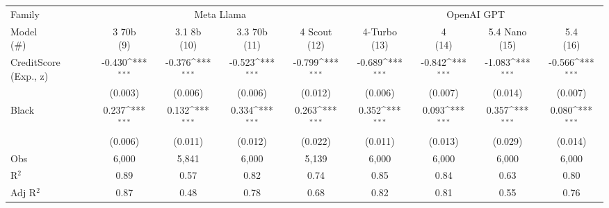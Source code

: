 {
\def\sym#1{\ifmmode^{#1}\else\(^{#1}\)\fi}
\begin{tabular}{l*{8}{c}}
\toprule
Family          &\multicolumn{4}{c}{Meta Llama}                                             &\multicolumn{4}{c}{OpenAI GPT}                                             \\\cmidrule(lr){2-5}\cmidrule(lr){6-9}
\shortstack{\vphantom{Model Opus}Model\\(\#)}&\shortstack{\vphantom{Model Opus}3 70b   \\(9)}         &\shortstack{\vphantom{Model Opus}3.1 8b  \\(10)}         &\shortstack{\vphantom{Model Opus}3.3 70b \\(11)}         &\shortstack{\vphantom{Model Opus}4 Scout \\(12)}         &\shortstack{\vphantom{Model Opus}4-Turbo \\(13)}         &\shortstack{\vphantom{Model Opus}4       \\(14)}         &\shortstack{\vphantom{Model Opus}5.4 Nano\\(15)}         &\shortstack{\vphantom{Model Opus}5.4     \\(16)}         \\
\midrule
CreditScore (Exp., z)&   -0.430\sym{***}&   -0.376\sym{***}&   -0.523\sym{***}&   -0.799\sym{***}&   -0.689\sym{***}&   -0.842\sym{***}&   -1.083\sym{***}&   -0.566\sym{***}\\
                &  (0.003)         &  (0.006)         &  (0.006)         &  (0.012)         &  (0.006)         &  (0.007)         &  (0.014)         &  (0.007)         \\
Black           &    0.237\sym{***}&    0.132\sym{***}&    0.334\sym{***}&    0.263\sym{***}&    0.352\sym{***}&    0.093\sym{***}&    0.357\sym{***}&    0.080\sym{***}\\
                &  (0.006)         &  (0.011)         &  (0.012)         &  (0.022)         &  (0.011)         &  (0.013)         &  (0.029)         &  (0.014)         \\
\midrule
Obs             &    6,000         &    5,841         &    6,000         &    5,139         &    6,000         &    6,000         &    6,000         &    6,000         \\
R$^2$           &     0.89         &     0.57         &     0.82         &     0.74         &     0.85         &     0.84         &     0.63         &     0.80         \\
Adj R$^2$       &     0.87         &     0.48         &     0.78         &     0.68         &     0.82         &     0.81         &     0.55         &     0.76         \\

\end{tabular}}
